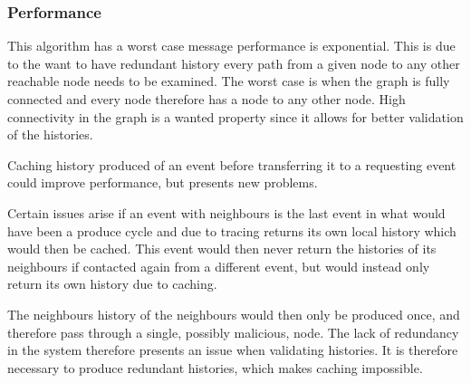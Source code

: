	\subsubsection{Performance}
	This algorithm has a worst case message performance is exponential.  This is due to the want to have redundant history every path from a given node to any other reachable node needs to be examined. The worst case is when the graph is fully connected and every node therefore has a node to any other node. High connectivity in the graph is a wanted property since it allows for better validation of the histories. 
	
	\newpar Caching history produced of an event before transferring it to a requesting event could improve performance, but presents new problems. 
	
	Certain issues arise if an event with neighbours is the last event in what would have been a produce cycle and due to tracing returns its own local history which would then be cached. This event would then never return the histories of its neighbours if contacted again from a different event, but would instead only return its own history due to caching. 
	
	The neighbours history of the neighbours would then only be produced once, and therefore pass through a single, possibly malicious, node. The lack of redundancy in the system therefore presents an issue when validating histories.
	It is therefore necessary to produce redundant histories, which makes caching impossible.